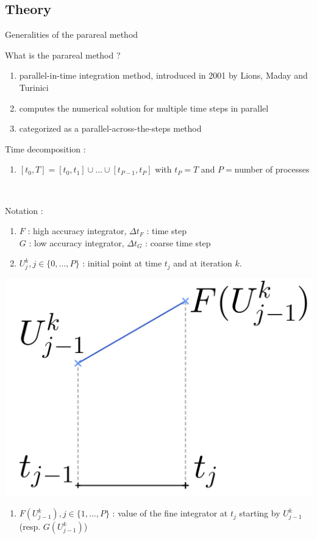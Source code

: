 \subsection{Theory}

\begin{frame}[allowframebreaks]{Generalities of the parareal method}
	
	\small
	What is the parareal method ?
	\begin{enumerate}[\textbullet]
		\item parallel-in-time integration method, introduced in 2001 by Lions, Maday and Turinici
		\item computes the numerical solution for multiple time steps in parallel
		\item categorized as a parallel-across-the-steps method 
	\end{enumerate}

	\newpage

	Time decomposition :
	\begin{enumerate}[\textbullet]
		\item $[t_0,T]=[t_0,t_1]\cup\dots\cup[t_{P-1},t_P]$ with $t_P=T$ and $P=$number of processes
	\end{enumerate}

	\; \\

	\begin{minipage}{.68\linewidth}
		Notation :
		\begin{enumerate}[\textbullet]
			\item $F$ : high accuracy integrator, \quad $\Delta t_F$ : time step \\
			$G$ : low accuracy integrator, \quad $\Delta t_G$ : coarse time step
			\item $U_j^k, j\in\{0,\dots,P\}$ : initial point at time $t_j$ and at iteration $k$.
		\end{enumerate}
	\end{minipage}
	\begin{minipage}{.28\linewidth}
		\qquad \includegraphics[width=0.7\linewidth]{images/parareal/explane_F.jpg}
	\end{minipage}
	\begin{enumerate}[\textbullet]
		\item $F(U_{j-1}^k), j\in\{1,\dots,P\}$ : value of the fine integrator at $t_j$ starting by $U_{j-1}^k$ (resp. $G(U_{j-1}^k)$)
	\end{enumerate}
	
\end{frame}

